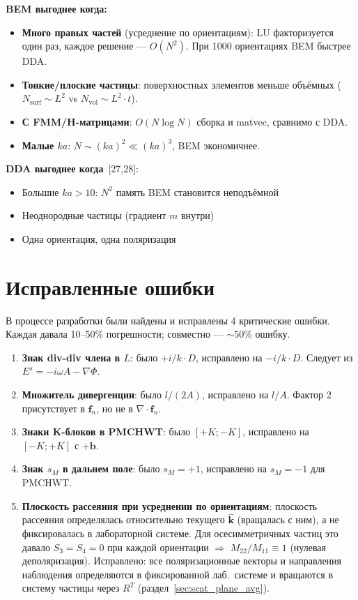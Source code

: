 \documentclass[12pt,a4paper]{article}
\begin{document}
\textbf{BEM выгоднее когда:}
\begin{itemize}
  \item \textbf{Много правых частей} (усреднение по ориентациям): LU факторизуется один раз, каждое решение --- $O(N^2)$. При 1000 ориентациях BEM быстрее DDA.
  \item \textbf{Тонкие/плоские частицы}: поверхностных элементов меньше объёмных ($N_{\mathrm{surf}} \sim L^2$ vs $N_{\mathrm{vol}} \sim L^2 \cdot t$).
  \item \textbf{С FMM/H-матрицами}: $O(N \log N)$ сборка и matvec, сравнимо с DDA.
  \item \textbf{Малые $ka$}: $N \sim (ka)^2 \ll (ka)^3$, BEM экономичнее.
\end{itemize}

\textbf{DDA выгоднее когда}~[27,28]:
\begin{itemize}
  \item Большие $ka > 10$: $N^2$ память BEM становится неподъёмной
  \item Неоднородные частицы (градиент $m$ внутри)
  \item Одна ориентация, одна поляризация
\end{itemize}


\section{Исправленные ошибки}

В процессе разработки были найдены и исправлены 4 критические ошибки. Каждая давала 10--50\% погрешности; совместно --- $\sim$50\% ошибку.

\begin{enumerate}
  \item \textbf{Знак div-div члена в $L$}: было $+i/k \cdot D$, исправлено на $-i/k \cdot D$. Следует из $E^s = -i\omega A - \nabla\Phi$.

  \item \textbf{Множитель дивергенции}: было $l/(2A)$, исправлено на $l/A$. Фактор 2 присутствует в $\mathbf{f}_n$, но не в $\nabla \cdot \mathbf{f}_n$.

  \item \textbf{Знаки K-блоков в PMCHWT}: было $[+K; -K]$, исправлено на $[-K; +K]$ с $+\mathbf{b}$.

  \item \textbf{Знак $s_M$ в дальнем поле}: было $s_M = +1$, исправлено на $s_M = -1$ для PMCHWT.

  \item \textbf{Плоскость рассеяния при усреднении по ориентациям}: плоскость рассеяния определялась относительно текущего $\hat{\mathbf{k}}$ (вращалась с ним), а не фиксировалась в лабораторной системе. Для осесимметричных частиц это давало $S_3 = S_4 = 0$ при каждой ориентации $\Rightarrow$ $M_{22}/M_{11} \equiv 1$ (нулевая деполяризация). Исправлено: все поляризационные векторы и направления наблюдения определяются в фиксированной лаб.\ системе и вращаются в систему частицы через $R^T$ (раздел~\ref{sec:scat_plane_avg}).
\end{enumerate}
\end{document}
